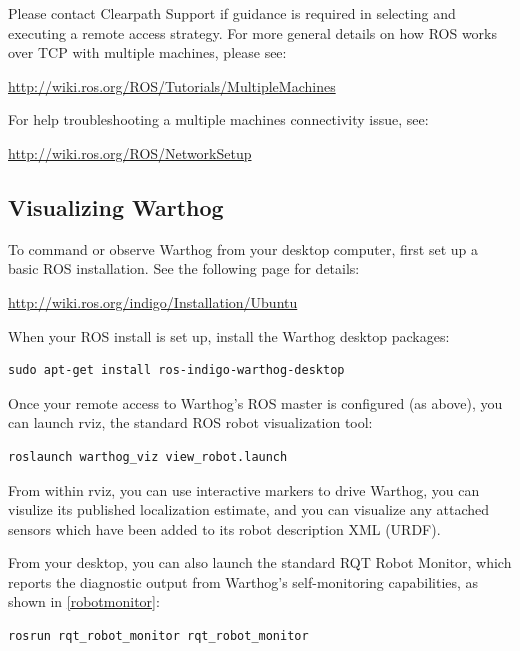 \documentclass[]{clearpath-latex/clearpath-manual}
\begin{document}
Please contact Clearpath Support if guidance is required in selecting and executing a remote access strategy.
For more general details on how ROS works over TCP with multiple machines, please see:

\url{http://wiki.ros.org/ROS/Tutorials/MultipleMachines}

For help troubleshooting a multiple machines connectivity issue, see:

\url{http://wiki.ros.org/ROS/NetworkSetup}

\subsection{Visualizing Warthog}

To command or observe Warthog from your desktop computer, first set up a basic ROS installation.  See the following page for details:

\url{http://wiki.ros.org/indigo/Installation/Ubuntu}

When your ROS install is set up, install the Warthog desktop packages:

\begin{lstlisting}
sudo apt-get install ros-indigo-warthog-desktop
\end{lstlisting}

Once your remote access to Warthog's ROS master is configured (as above), you can launch rviz, the standard ROS robot visualization tool:

\begin{lstlisting}
roslaunch warthog_viz view_robot.launch
\end{lstlisting}

From within rviz, you can use interactive markers to drive Warthog, you can visulize its published localization estimate, and you can visualize any attached sensors which have been added to its robot description XML (URDF).

\pagebreak[4]

From your desktop, you can also launch the standard RQT Robot Monitor, which reports the diagnostic output from Warthog's self-monitoring capabilities, as shown in \autoref{robotmonitor}:

\begin{lstlisting}
rosrun rqt_robot_monitor rqt_robot_monitor
\end{lstlisting}
\end{document}
